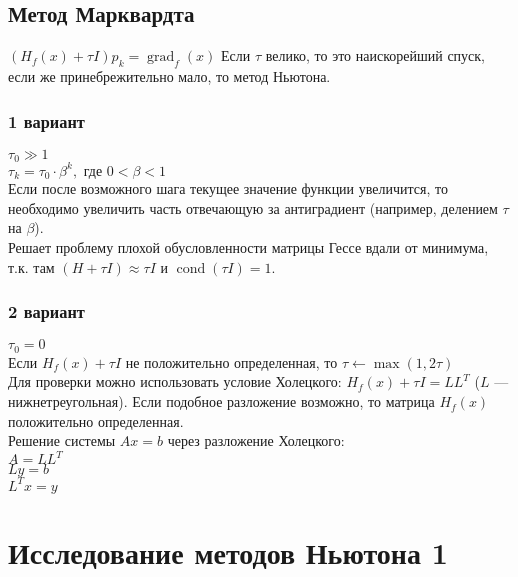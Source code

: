 \documentclass[russian, english]{article}
\begin{document}
\subsection{Метод Марквардта}
$(H_f(x) + \tau I)p_k=\operatorname{grad}_f(x)$
Если $\tau$ велико, то это наискорейший спуск, если же принебрежительно мало, то метод Ньютона.
\subsubsection{1 вариант}
$\tau_0 \gg 1$\\
$\tau_k = \tau_0\cdot \beta^k, \text{ где } 0 < \beta < 1$\\
Если после возможного шага текущее значение функции увеличится, то необходимо увеличить часть отвечающую за антиградиент (например, делением $\tau$ на $\beta$).\\
Решает проблему плохой обусловленности матрицы Гессе вдали от минимума, т.к. там $(H+\tau I)\approx\tau I$ и $\operatorname{cond}(\tau I) = 1$.
\subsubsection{2 вариант}
$\tau_0 = 0$\\
Если $H_f(x) + \tau I$ не положительно определенная, то $\tau \leftarrow \operatorname{max}(1, 2\tau)$\\
Для проверки можно использовать условие Холецкого: $H_f(x)+\tau I = LL^T$ ($L$ --- нижнетреугольная). Если подобное разложение возможно, то матрица $H_f(x)$ положительно определенная.\\
Решение системы $Ax=b$ через разложение Холецкого:\\
$A=LL^T$\\
$Ly=b$\\
$L^Tx=y$

\newcommand{\MakePlots}{}
\newcommand{\methodsList}{{}}

\newcommand{\ItersLast}[1]{
	\noindent
	\begin{minipage}{\textwidth}
	\begin{center}
	Количество итераций:\\
	\csvautotabular[separator=tab]{#1/iters.tsv}\\
	Последняя точка:\\
	\csvautotabular[separator=tab]{#1/last.tsv}
	\end{center}
	\end{minipage}
}

\section{Исследование методов Ньютона 1}
\end{document}
